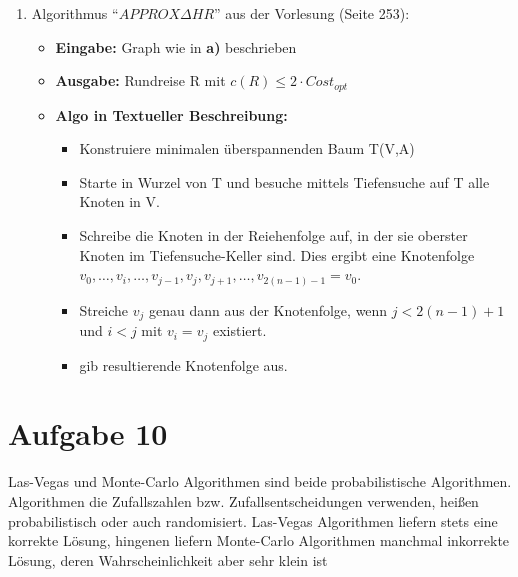 \documentclass[10pt,a4paper]{article}
\begin{document}
\begin{enumerate}[label={\alph*)}]
        \item Algorithmus ``$APPROX \Delta HR$'' aus der Vorlesung (Seite 253):
            \begin{itemize}
                \item \textbf{Eingabe:} Graph wie in \textbf{a)} beschrieben
                \item \textbf{Ausgabe:} Rundreise R mit $c(R) \leq 2 \cdot Cost_{opt}$
                \item \textbf{Algo in Textueller Beschreibung:} \\
                    \begin{itemize}
                        \item Konstruiere minimalen überspannenden Baum T(V,A)
                        \item Starte in Wurzel von T und besuche mittels Tiefensuche
                            auf T alle Knoten in V.
                        \item Schreibe die Knoten in der Reiehenfolge auf, in der
                            sie oberster Knoten im Tiefensuche-Keller sind. Dies
                            ergibt eine Knotenfolge $v_0,\ldots,v_i,\ldots,
                            v_{j-1},v_j,v_{j+1},\ldots,v_{2(n-1)-1} = v_0$.
                        \item Streiche $v_j$ genau dann aus der Knotenfolge, wenn
                        $ j < 2(n-1) + 1 $ und $ i < j $ mit $ v_i = v_j$ existiert.
                        \item gib resultierende Knotenfolge aus.
                    \end{itemize}

            \end{itemize}



            
    \end{enumerate}

    
\section*{Aufgabe 10}
    Las-Vegas und Monte-Carlo Algorithmen sind beide 
    probabilistische Algorithmen. Algorithmen die Zufallszahlen 
    bzw. Zufallsentscheidungen verwenden, heißen probabilistisch 
    oder auch randomisiert. Las-Vegas Algorithmen liefern stets 
    eine korrekte Lösung, hingenen liefern Monte-Carlo Algorithmen 
    manchmal inkorrekte Lösung, deren Wahrscheinlichkeit aber sehr klein ist
    
\end{document}

